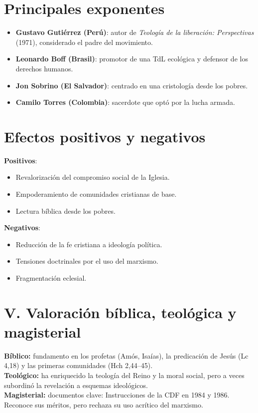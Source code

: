 \documentclass[12pt]{article}
\begin{document}
\section*{Principales exponentes}

\begin{itemize}
    \item \textbf{Gustavo Gutiérrez (Perú)}: autor de \textit{Teología de la liberación: Perspectivas} (1971), considerado el padre del movimiento.
    \item \textbf{Leonardo Boff (Brasil)}: promotor de una TdL ecológica y defensor de los derechos humanos.
    \item \textbf{Jon Sobrino (El Salvador)}: centrado en una cristología desde los pobres.
    \item \textbf{Camilo Torres (Colombia)}: sacerdote que optó por la lucha armada.
\end{itemize}

\section*{Efectos positivos y negativos}

\textbf{Positivos}:
\begin{itemize}
    \item Revalorización del compromiso social de la Iglesia.
    \item Empoderamiento de comunidades cristianas de base.
    \item Lectura bíblica desde los pobres.
\end{itemize}

\textbf{Negativos}:
\begin{itemize}
    \item Reducción de la fe cristiana a ideología política.
    \item Tensiones doctrinales por el uso del marxismo.
    \item Fragmentación eclesial.
\end{itemize}

\section*{V. Valoración bíblica, teológica y magisterial}

\textbf{Bíblico:} fundamento en los profetas (Amós, Isaías), la predicación de Jesús (Lc 4,18) y las primeras comunidades (Hch 2,44–45).\\
\textbf{Teológico:} ha enriquecido la teología del Reino y la moral social, pero a veces subordinó la revelación a esquemas ideológicos.\\
\textbf{Magisterial:} documentos clave: Instrucciones de la CDF en 1984 y 1986. Reconoce sus méritos, pero rechaza su uso acrítico del marxismo.
\end{document}
